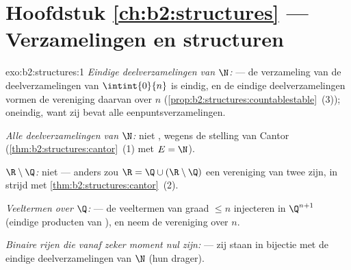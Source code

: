 \section*{Hoofdstuk \ref{ch:b2:structures} --- Verzamelingen en structuren}

\begin{solution}{exo:b2:structures:1}
\emph{Eindige deelverzamelingen van $\N$:}  --- de
verzameling van de deelverzamelingen van $\intint{0}{n}$ is eindig,
en de eindige deelverzamelingen vormen de  vereniging
daarvan over $n$
(\cref{prop:b2:structures:countablestable}~(3)); oneindig, want zij
bevat alle eenpuntsverzamelingen.

\emph{Alle deelverzamelingen van $\N$:} niet , wegens de
stelling van Cantor (\cref{thm:b2:structures:cantor}~(1) met $E =
\N$).

\emph{$\R \setminus \Q$:} niet  --- anders zou $\R = \Q
\cup (\R\setminus\Q)$ een vereniging van twee  zijn, in strijd met
\cref{thm:b2:structures:cantor}~(2).

\emph{Veeltermen over $\Q$:}  --- de veeltermen van graad
$\leq n$ injecteren in $\Q^{n+1}$ (eindige producten van ), en neem de vereniging over $n$.

\emph{Binaire rijen die vanaf zeker moment nul zijn:}  ---
zij staan in bijectie met de eindige deelverzamelingen van $\N$
(hun drager).
\end{solution}

